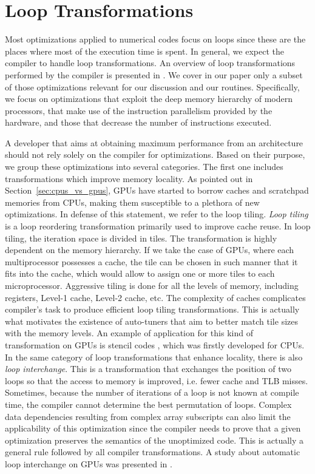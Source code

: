 \section{Loop Transformations}
\label{sec:optimizations}

Most optimizations applied to numerical codes focus on loops since these are the
places where most of the execution time is spent. In general, we expect the
compiler to handle loop transformations. An overview of loop transformations
performed by the compiler is presented in \cite{Bacon:1994:CTH:197405.197406}.
We cover in our paper only a subset of those optimizations relevant for our
discussion and our routines. Specifically, we focus on optimizations that
exploit the deep memory hierarchy of modern processors, that make use of the
instruction parallelism provided by the hardware, and those that decrease the
number of instructions executed.

A developer that aims at obtaining maximum performance from an architecture
should not rely solely on the compiler for optimizations. Based on their
purpose, we group these optimizations into several categories. The first one
includes transformations which improve memory locality. As pointed out in
Section~\ref{sec:cpus_vs_gpus}, GPUs have started to borrow caches and
scratchpad memories from CPUs, making them susceptible to a plethora of
new optimizations. In defense of this statement, we refer to the loop tiling.
\textit{Loop tiling} is a loop reordering transformation primarily used to
improve cache reuse. In loop tiling, the iteration space is divided in tiles.
The transformation is highly dependent on the memory hierarchy. If we take the
case of GPUs, where each multiprocessor possesses a cache, the tile can be
chosen in such manner that it fits into the cache, which would allow to assign
one or more tiles to each microprocessor. Aggressive tiling is done for all the
levels of memory, including registers, Level-1 cache, Level-2 cache, etc. The
complexity of caches complicates compiler's task to produce efficient loop
tiling transformations. This is actually what motivates the existence of
auto-tuners that aim to better match tile sizes with the memory levels. An
example of application for this kind of transformation on GPUs is stencil codes
\cite{volkov2010}, which was firstly developed for CPUs. In the same category of
loop transformations that enhance locality, there is also \textit{loop
interchange}. This is a transformation that exchanges the position of two loops
so that the access to memory is improved, i.e. fewer cache and TLB misses.
Sometimes, because the number of iterations of a loop is not known at compile
time, the compiler cannot determine the best permutation of loops. Complex data
dependencies resulting from complex array subscripts can also limit the
applicability of this optimization since the compiler needs to prove that a
given optimization preserves the semantics of the unoptimized code. This is
actually a general rule followed by all compiler transformations. A study about
automatic loop interchange on GPUs was presented in
\cite{Leung:2009:APG:1596655.1596670}.

